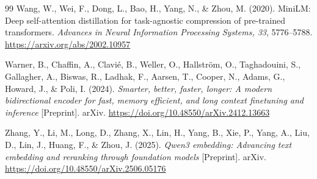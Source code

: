 \begin{thebibliography}{99}
Wang, W., Wei, F., Dong, L., Bao, H., Yang, N., \& Zhou, M. (2020).
MiniLM: Deep self-attention distillation for task-agnostic compression of pre-trained transformers.
\textit{Advances in Neural Information Processing Systems, 33}, 5776--5788.
\url{https://arxiv.org/abs/2002.10957}

Warner, B., Chaffin, A., Clavié, B., Weller, O., Hallström, O., Taghadouini, S., Gallagher, A., Biswas, R., Ladhak, F., Aarsen, T., Cooper, N., Adams, G., Howard, J., \& Poli, I. (2024).
\textit{Smarter, better, faster, longer: A modern bidirectional encoder for fast, memory efficient, and long context finetuning and inference} [Preprint]. arXiv.
\url{https://doi.org/10.48550/arXiv.2412.13663}

Zhang, Y., Li, M., Long, D., Zhang, X., Lin, H., Yang, B., Xie, P., Yang, A., Liu, D., Lin, J., Huang, F., \& Zhou, J. (2025).
\textit{Qwen3 embedding: Advancing text embedding and reranking through foundation models} [Preprint]. arXiv.
\url{https://doi.org/10.48550/arXiv.2506.05176}
\end{thebibliography}
